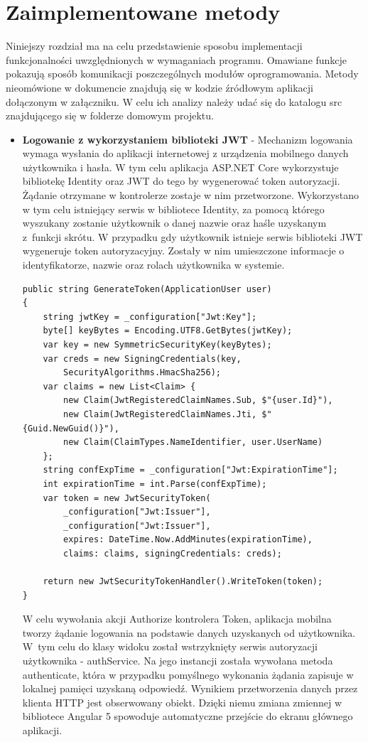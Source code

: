\section{Zaimplementowane metody}
Niniejszy rozdział ma na celu przedstawienie sposobu implementacji funkcjonalności uwzględnionych w wymaganiach programu. Omawiane funkcje pokazują sposób komunikacji poszczególnych modułów oprogramowania. Metody nieomówione w dokumencie znajdują się w kodzie źródłowym aplikacji dołączonym w załączniku. W celu ich analizy należy udać się do katalogu src znajdującego się w folderze domowym projektu.
\\
\begin{itemize}
\item \textbf{Logowanie z wykorzystaniem biblioteki JWT} - Mechanizm logowania wymaga wysłania do aplikacji internetowej z urządzenia mobilnego danych użytkownika i hasła. W tym celu aplikacja ASP.NET Core wykorzystuje bibliotekę Identity oraz JWT do tego by wygenerować token autoryzacji. Żądanie otrzymane w kontrolerze zostaje w nim przetworzone. Wykorzystano w tym celu istniejący serwis w bibliotece Identity, za pomocą którego wyszukany zostanie użytkownik o danej nazwie oraz haśle uzyskanym z~funkcji skrótu. W przypadku gdy użytkownik istnieje serwis biblioteki JWT wygeneruje token autoryzacyjny. Zostały w nim umieszczone informacje o identyfikatorze, nazwie oraz rolach użytkownika w systemie.

\begin{lstlisting}[caption=Metoda generująca token JWT.]
 public string GenerateToken(ApplicationUser user)
{
	string jwtKey = _configuration["Jwt:Key"];
	byte[] keyBytes = Encoding.UTF8.GetBytes(jwtKey);
	var key = new SymmetricSecurityKey(keyBytes);
	var creds = new SigningCredentials(key,
		SecurityAlgorithms.HmacSha256);
	var claims = new List<Claim> {
		new Claim(JwtRegisteredClaimNames.Sub, $"{user.Id}"),
		new Claim(JwtRegisteredClaimNames.Jti, $"{Guid.NewGuid()}"),
		new Claim(ClaimTypes.NameIdentifier, user.UserName)
	};
	string confExpTime = _configuration["Jwt:ExpirationTime"];
	int expirationTime = int.Parse(confExpTime);
	var token = new JwtSecurityToken(
		_configuration["Jwt:Issuer"],
		_configuration["Jwt:Issuer"],
		expires: DateTime.Now.AddMinutes(expirationTime),
		claims: claims, signingCredentials: creds);
	
	return new JwtSecurityTokenHandler().WriteToken(token);
}
\end{lstlisting} 

W celu wywołania akcji Authorize kontrolera Token, aplikacja mobilna tworzy żądanie logowania na podstawie danych uzyskanych od użytkownika. W~tym celu do klasy widoku został wstrzyknięty serwis autoryzacji użytkownika - authService. Na jego instancji została wywołana metoda authenticate, która w przypadku pomyślnego wykonania żądania zapisuje w lokalnej pamięci uzyskaną odpowiedź. Wynikiem przetworzenia danych przez klienta HTTP jest obserwowany obiekt. Dzięki niemu zmiana zmiennej w bibliotece Angular 5 spowoduje automatyczne przejście do ekranu głównego aplikacji.


\end{itemize}
